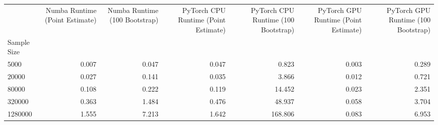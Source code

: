 \begin{tabular}{lrrrrrr}
\toprule
 & Numba Runtime (Point Estimate) & Numba Runtime (100 Bootstrap) & PyTorch CPU Runtime (Point Estimate) & PyTorch CPU Runtime (100 Bootstrap) & PyTorch GPU Runtime (Point Estimate) & PyTorch GPU Runtime (100 Bootstrap) \\
Sample Size &  &  &  &  &  &  \\
\midrule
5000 & 0.007 & 0.047 & 0.047 & 0.823 & 0.003 & 0.289 \\
20000 & 0.027 & 0.141 & 0.035 & 3.866 & 0.012 & 0.721 \\
80000 & 0.108 & 0.222 & 0.119 & 14.452 & 0.023 & 2.351 \\
320000 & 0.363 & 1.484 & 0.476 & 48.937 & 0.058 & 3.704 \\
1280000 & 1.555 & 7.213 & 1.642 & 168.806 & 0.083 & 6.953 \\
\bottomrule
\end{tabular}
